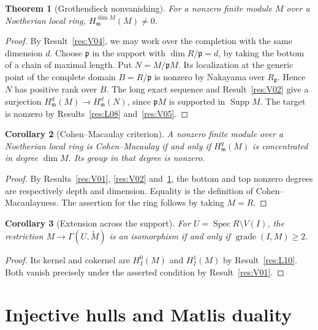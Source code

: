 \documentclass[11pt,oneside,openany]{book}
\newtheorem{theorem}{Theorem}[chapter]
\newtheorem{corollary}[theorem]{Corollary}
\theoremstyle{definition}
\theoremstyle{remark}
\begin{document}
\begin{theorem}[Grothendieck nonvanishing]\label{res:V06}
For a nonzero finite module \(M\) over a Noetherian local ring,
\(H_{\mathfrak m}^{\dim M}(M)\ne0\).
\end{theorem}
\begin{proof}
By Result~\ref{res:V04}, we may work over the completion with the
same dimension \(d\). Choose \(\mathfrak p\) in the support with
\(\dim R/\mathfrak p=d\), by taking the bottom of a chain of maximal
length. Put \(N=M/\mathfrak pM\). Its localization at the generic
point of the complete domain \(B=R/\mathfrak p\) is nonzero by
Nakayama over \(R_{\mathfrak p}\). Hence \(N\) has positive rank over
\(B\). The long exact sequence and Result~\ref{res:V02} give a
surjection \(H_{\mathfrak m}^d(M)\to H_{\mathfrak m}^d(N)\), since
\(\mathfrak p M\) is supported in \(\operatorname{Supp}M\).
The target is nonzero by Results~\ref{res:L08} and~\ref{res:V05}.
\end{proof}

\begin{corollary}[Cohen--Macaulay criterion]\label{res:V07}
A nonzero finite module over a Noetherian local ring is
Cohen--Macaulay if and only if \(H^q_{\mathfrak m}(M)\) is
concentrated in degree \(\dim M\). Its group in that degree is nonzero.
\end{corollary}
\begin{proof}
By Results~\ref{res:V01}, \ref{res:V02} and~\ref{res:V06},
the bottom and top nonzero degrees are respectively depth and
dimension. Equality is the definition of Cohen--Macaulayness.
The assertion for the ring follows by taking \(M=R\).
\end{proof}

\begin{corollary}[Extension across the support]\label{res:V08}
For \(U=\operatorname{Spec}R\setminus V(I)\), the restriction
\(M\to\Gamma(U,\widetilde M)\) is an isomorphism if and only if
\(\operatorname{grade}(I,M)\geq2\).
\end{corollary}
\begin{proof}
Its kernel and cokernel are \(H_I^0(M)\) and \(H_I^1(M)\) by
Result~\ref{res:L10}. Both vanish precisely under the asserted
condition by Result~\ref{res:V01}.
\end{proof}
\chapter{Injective hulls and Matlis duality}\label{ch:matlis}
\end{document}
